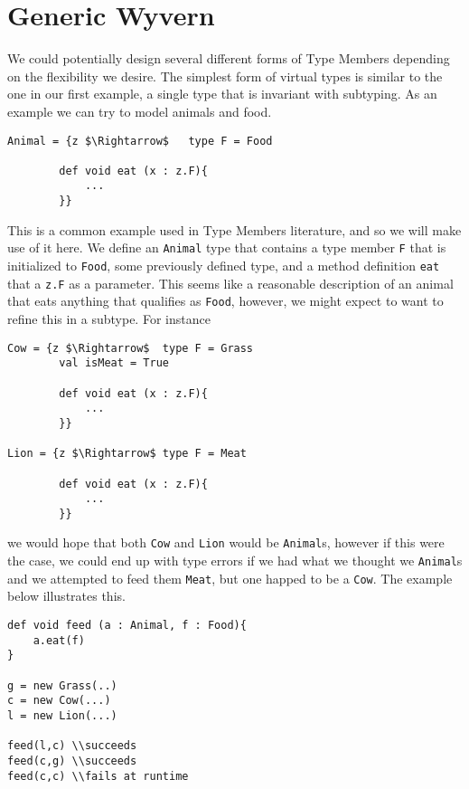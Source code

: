 \documentclass[11pt
              , a4paper
              , twoside
              , openright
              ]{report}
\numberwithin{case}{theorem}
\numberwithin{subcase}{case}
\begin{document}
%






\chapter{Generic Wyvern}\label{ch:wyvern}
We could potentially design several different forms of Type Members depending on the flexibility we desire. The simplest form of virtual types is similar to the one in our first example, a single type that is invariant with subtyping. As an example we can try to model animals and food. 
\begin{lstlisting}[mathescape, style=custom_lang]
Animal = {z $\Rightarrow$	type F = Food
		
		def void eat (x : z.F){
			...
		}}
\end{lstlisting}
This is a common example used in Type Members literature, and so we will make use of it here. We define an \verb|Animal| type that contains a type member \verb|F| that is initialized to \verb|Food|, some previously defined type, and a method definition \verb|eat| that a \verb|z.F| as a parameter. This seems like a reasonable description of an animal that eats anything that qualifies as \verb|Food|, however, we might expect to want to refine this in a subtype. For instance
\begin{lstlisting}[mathescape, style=custom_lang]
Cow = {z $\Rightarrow$	type F = Grass
		val isMeat = True
		
		def void eat (x : z.F){
			...
		}}

Lion = {z $\Rightarrow$	type F = Meat
		
		def void eat (x : z.F){
			...
		}}
\end{lstlisting}
we would hope that both \verb|Cow| and \verb|Lion| would be \verb|Animal|s, however if this were the case, we could end up with type errors if we had what we thought we \verb|Animal|s and we attempted to feed them \verb|Meat|, but one happed to be a \verb|Cow|. The example below illustrates this.
\begin{lstlisting}[mathescape, style=custom_lang]
def void feed (a : Animal, f : Food){
	a.eat(f)
}

g = new Grass(..)
c = new Cow(...)
l = new Lion(...)

feed(l,c) \\succeeds
feed(c,g) \\succeeds
feed(c,c) \\fails at runtime
\end{lstlisting}
\end{document}
